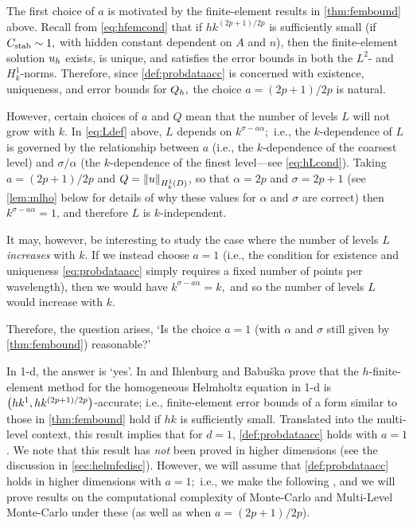 The first choice of $a$ is motivated by the finite-element results in \cref{thm:fembound} above. Recall from \cref{eq:hfemcond} that if $hk^{(2p+1)/2p}$ is sufficiently small (if $C_{\mathrm{stab}} \sim 1,$ with hidden constant dependent on $A$ and $n$), then the finite-element solution $u_{h}$ exists, is unique, and satisfies the error bounds in both the $L^2$- and $H^1_k$-norms. Therefore, since \cref{def:probdataacc} is concerned with existence, uniqueness, and error bounds for $Q_{h},$ the choice $a=(2p+1)/2p$ is natural.

However, certain choices of $a$ and $Q$ mean that the number of levels $L$ will not grow with $k.$ In \cref{eq:Ldef} above, $L$ depends on $k^{\sigma-a\alpha};$ i.e., the $k$-dependence of $L$ is governed by the relationship between $a$ (i.e., the $k$-dependence of the coarsest level) and $\sigma/\alpha$ (the $k$-dependence of the finest level---see \cref{eq:hLcond}). Taking $a=(2p+1)/2p$ and $Q = \NHokD{u}$, so that $\alpha = 2p$ and $\sigma = 2p+1$ (see \cref{lem:mlho} below for details of why these values for $\alpha$ and $\sigma$ are correct) then $k^{\sigma-a\alpha} = 1$, and therefore $L$ is $k$-independent.

It may, however, be interesting to study the case where the number of levels $L$ \emph{increases} with $k$. If we instead choose $a=1$ (i.e., the condition for existence and uniqueness \cref{eq:probdataacc} simply requires a fixed number of points per wavelength), then we would have $k^{\sigma - a\alpha} = k,$ and so the number of levels $L$ would increase with $k.$ 

Therefore, the question arises, `Is the choice $a=1$ (with $\alpha$ and $\sigma$ still given by \cref{thm:fembound}) reasonable?'

In 1-d, the answer is `yes'. In \cite[Corollary 3.2]{IhBa:97} and \cite[Theorem 4.27 and equation (4.7.41)]{Ih:98} Ihlenburg and Babu\v{s}ka prove that the $h$-finite-element method for the homogeneous Helmholtz equation in 1-d is $\hk{1}{(2p+1)/2p}$-accurate; i.e., finite-element error bounds of a form similar to those in \cref{thm:fembound} hold if $hk$ is sufficiently small. Translated into the multi-level context, this result implies that for $d=1$, \cref{def:probdataacc} holds with $a=1$. We note that this result has \emph{not} been proved in higher dimensions (see the discussion in \cref{sec:helmfedisc}). However, we will assume that \cref{def:probdataacc} holds in higher dimensions with $a=1;$ i.e., we make the following , and we will prove results on the computational complexity of Monte-Carlo and Multi-Level Monte-Carlo under these  (as well as when $a=(2p+1)/2p$).

